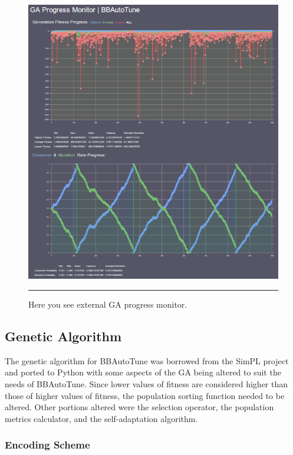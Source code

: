 \begin{figure}[htbp]
\centering
\includegraphics[scale=0.6]{../Figures/Chapter4/ga_monitor.png}
\rule{35em}{0.5pt}
\caption[GA Progress Monitor]{Here you see external GA progress monitor.}
\label{fig:ga_monitor}
\end{figure}

\subsection{Genetic Algorithm}

The genetic algorithm for BBAutoTune was borrowed from the SimPL project and ported to Python with some aspects of the GA being altered to suit the needs of BBAutoTune. Since lower values of fitness are considered higher than those of higher values of fitness, the population sorting function needed to be altered. Other portions altered were the selection operator, the population metrics calculator, and the self-adaptation algorithm.  

\subsubsection{Encoding Scheme}

